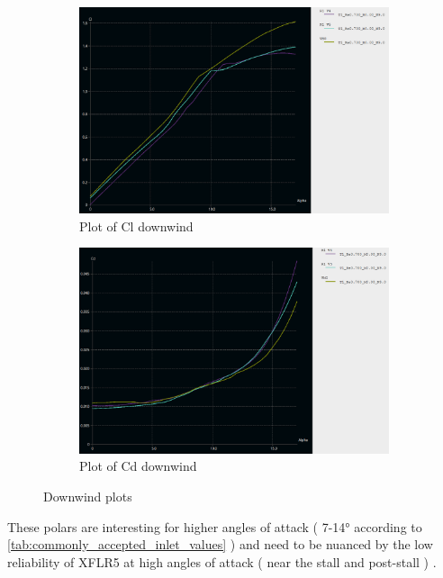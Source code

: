 \begin{figure}[H]
\begin{subfigure}{0.5\textwidth}
\includegraphics[width=1.\textwidth]{figures/2D steady simulations/xflr5/Cl downwind.png}
\caption{Plot of Cl downwind}
\label{fig:Plot_of_Cl_downwind}
\end{subfigure}
\begin{subfigure}{0.5\textwidth}
\includegraphics[width=1.\textwidth]{figures/2D steady simulations/xflr5/Cd Downwind.png}
\caption{Plot of Cd downwind}
\label{fig:Plot_of_Cd_downwind}
\end{subfigure}
\caption{Downwind plots}
\label{fig:Downwind_plots}
\end{figure}

These polars are interesting for higher angles of attack ( 7-14° according to \ref{tab:commonly_accepted_inlet_values} ) and need to be nuanced by the low reliability of XFLR5 at high angles of attack ( near the stall and post-stall ) \cite{XFOILlimits}. 



